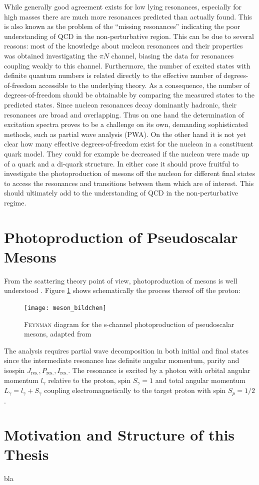 While generally good agreement exists for low lying resonances, especially for high masses there are much more resonances predicted than actually found. This is also known as the problem of the \enquote{missing resonances} indicating the poor understanding of QCD in the non-perturbative region. This can be due to several reasons: most of the knowledge about nucleon resonances and their properties was obtained investigating the $\pi N$ channel, biasing the data for resonances coupling weakly to this channel. Furthermore, the number of excited states with definite quantum numbers is related directly to the effective number of degrees-of-freedom accessible to the underlying theory. As a consequence, the number of degrees-of-freedom should be obtainable by comparing the measured states to the predicted states. Since nucleon resonances decay dominantly hadronic, their resonances are broad and overlapping. Thus on one hand the determination of excitation spectra proves to be a challenge on its own, demanding sophisticated methods, such as partial wave analysis (PWA). On the other hand it is not yet clear how many effective degrees-of-freedom exist for the nucleon in a constituent quark model. They could for example be decreased if the nucleon were made up of a quark and a di-quark structure. In either case it should prove fruitful to investigate the photoproduction of mesons off the nucleon for different final states to access the resonances and transitions between them which are of interest. This should ultimately add to the understanding of QCD in the non-perturbative regime. \cite{Krusche}


\section{Photoproduction of Pseudoscalar Mesons}
From the scattering theory point of view, photoproduction of mesons is well understood \cite{Krusche}. Figure \ref{fig:mes_bildchen} shows schematically the process thereof off the proton:

\begin{figure}[htbp]
	\centering
	\texttt{[image: meson\_bildchen]}
	\caption{\textsc{Feynman} diagram for the s-channel photoproduction of pseudoscalar mesons, adapted from \cite{farahphd}}
	\label{fig:mes_bildchen}
\end{figure}

The analysis requires partial wave decomposition in both initial and final states \cite{Drechsel} since the intermediate resonance has definite angular momentum, parity  and isospin $J_\text{res.}, P_\text{res.}, I_\text{res.}$. The resonance is excited by a photon with orbital angular momentum $l_\gamma$ relative to the proton, spin $S_\gamma=1$ and total angular momentum $L_\gamma=l_\gamma+S_\gamma$ coupling electromagnetically to the target proton with spin $S_p=1/2$.



\section{Motivation and Structure of this Thesis}
bla
